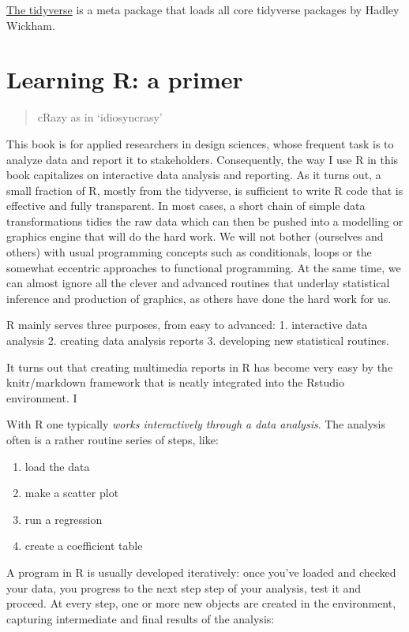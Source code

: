 \documentclass[]{svmono}
\providecommand{\tightlist}{%
  \setlength{\itemsep}{0pt}\setlength{\parskip}{0pt}}
\theoremstyle{definition}
\theoremstyle{definition}
\theoremstyle{definition}
\theoremstyle{remark}
\begin{document}
\href{http://tidyverse.org/}{The tidyverse} is a meta package that loads
all core tidyverse packages by Hadley Wickham.

\section{Learning R: a primer}\label{learning-r-a-primer}

\begin{quote}
cRazy as in `idiosyncrasy'
\end{quote}

This book is for applied researchers in design sciences, whose frequent
task is to analyze data and report it to stakeholders. Consequently, the
way I use R in this book capitalizes on interactive data analysis and
reporting. As it turns out, a small fraction of R, mostly from the
tidyverse, is sufficient to write R code that is effective and fully
transparent. In most cases, a short chain of simple data transformations
tidies the raw data which can then be pushed into a modelling or
graphics engine that will do the hard work. We will not bother
(ourselves and others) with usual programming concepts such as
conditionals, loops or the somewhat eccentric approaches to functional
programming. At the same time, we can almost ignore all the clever and
advanced routines that underlay statistical inference and production of
graphics, as others have done the hard work for us.

R mainly serves three purposes, from easy to advanced: 1. interactive
data analysis 2. creating data analysis reports 3. developing new
statistical routines.

It turns out that creating multimedia reports in R has become very easy
by the knitr/markdown framework that is neatly integrated into the
Rstudio environment. I

With R one typically \emph{works interactively through a data analysis}.
The analysis often is a rather routine series of steps, like:

\begin{enumerate}
\def\labelenumi{\arabic{enumi}.}
\tightlist
\item
  load the data
\item
  make a scatter plot
\item
  run a regression
\item
  create a coefficient table
\end{enumerate}

A program in R is usually developed iteratively: once you've loaded and
checked your data, you progress to the next step step of your analysis,
test it and proceed. At every step, one or more new objects are created
in the environment, capturing intermediate and final results of the
analysis:
\end{document}
